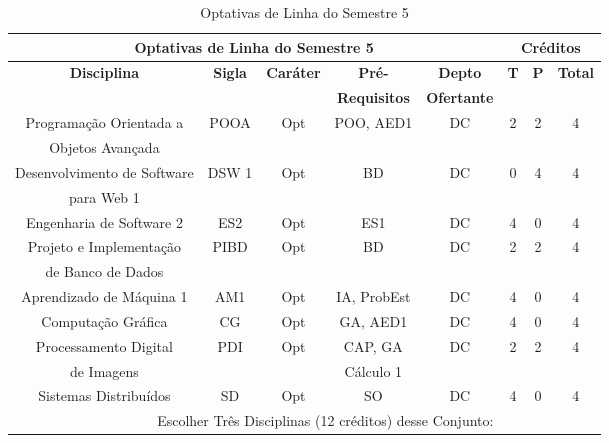 \begin{table}[H]
\caption{Optativas de Linha do Semestre 5}
\centering
\footnotesize
\begin{tabular}{|c|c|c|c|c|c|c|c|} %
\hline
\hline
\multicolumn{5}{|c|}{\textbf{Optativas de Linha do Semestre 5}}  &  \multicolumn{3}{|c|}{\textbf{Créditos}} \\
\hline
\hline
\textbf{Disciplina} & \textbf{Sigla} & \textbf{Caráter} & \textbf{Pré-} & \textbf{Depto} &  \textbf{T}  &  \textbf{P}  & \textbf{Total} \\ 
& & & \textbf{Requisitos}  & \textbf{Ofertante} & & & \\
\hline 
Programação Orientada a & POOA & Opt & POO, AED1 & DC & 2 & 2 & 4 \\
Objetos Avançada & & & & & & & \\ 
\hline
Desenvolvimento de Software & DSW 1 & Opt & BD & DC & 0 & 4 & 4 \\
para Web 1 & & & & & & & \\
\hline
Engenharia de Software 2 & ES2 & Opt & ES1 & DC & 4 & 0 & 4 \\
\hline
Projeto e Implementação & PIBD & Opt & BD & DC & 2 & 2 & 4 \\
de Banco de Dados & & & & & & & \\
\hline
Aprendizado de Máquina 1 & AM1 & Opt & IA, ProbEst & DC & 4 & 0 & 4 \\
\hline
Computação Gráfica & CG & Opt & GA, AED1 & DC & 4 & 0 & 4 \\
\hline
Processamento Digital & PDI & Opt & CAP, GA & DC & 2 & 2 & 4 \\
de Imagens & & & Cálculo 1 & & & & \\  
\hline
Sistemas Distribuídos & SD & Opt & SO & DC & 4 & 0 & 4 \\
\hline
\hline

\multicolumn{5}{|r|}{Escolher Três Disciplinas (12 créditos) desse Conjunto:}  &    &     &  \\
\hline
\hline
\end{tabular}
\label{tab:OptTrilha-Semestre5}
\end{table}


